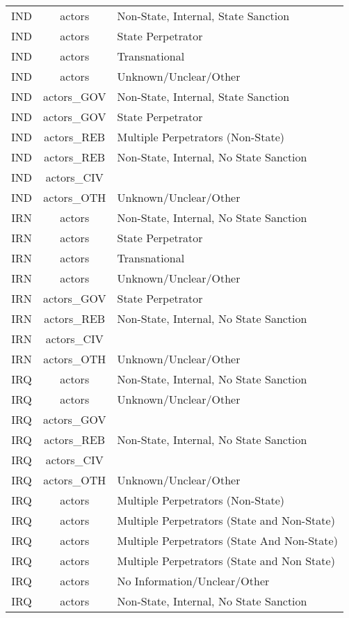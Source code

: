 \documentclass[12pt]{article}
\begin{document}
\begin{center}
\begin{longtable}{|c|c|p{10cm}|}
  IND & actors & Non-State, Internal, State Sanction \\ 
  IND & actors & State Perpetrator \\ 
  IND & actors & Transnational \\ 
  IND & actors & Unknown/Unclear/Other \\ 
  IND & actors\_GOV & Non-State, Internal, State Sanction \\ 
  IND & actors\_GOV & State Perpetrator \\ 
  IND & actors\_REB & Multiple Perpetrators (Non-State) \\ 
  IND & actors\_REB & Non-State, Internal, No State Sanction \\ 
  IND & actors\_CIV &  \\ 
  IND & actors\_OTH & Unknown/Unclear/Other \\ 
  IRN & actors & Non-State, Internal, No State Sanction \\ 
  IRN & actors & State Perpetrator \\ 
  IRN & actors & Transnational \\ 
  IRN & actors & Unknown/Unclear/Other \\ 
  IRN & actors\_GOV & State Perpetrator \\ 
  IRN & actors\_REB & Non-State, Internal, No State Sanction \\ 
  IRN & actors\_CIV &  \\ 
  IRN & actors\_OTH & Unknown/Unclear/Other \\ 
  IRQ  & actors & Non-State, Internal, No State Sanction \\ 
  IRQ  & actors & Unknown/Unclear/Other \\ 
  IRQ  & actors\_GOV &  \\ 
  IRQ  & actors\_REB & Non-State, Internal, No State Sanction \\ 
  IRQ  & actors\_CIV &  \\ 
  IRQ  & actors\_OTH & Unknown/Unclear/Other \\ 
  IRQ & actors & Multiple Perpetrators (Non-State) \\ 
  IRQ & actors & Multiple Perpetrators (State and Non-State) \\ 
  IRQ & actors & Multiple Perpetrators (State And Non-State) \\ 
  IRQ & actors & Multiple Perpetrators (State and Non State) \\ 
  IRQ & actors & No Information/Unclear/Other \\ 
  IRQ & actors & Non-State, Internal,  No State Sanction \\ 

\end{longtable}
\end{center}
\end{document}
